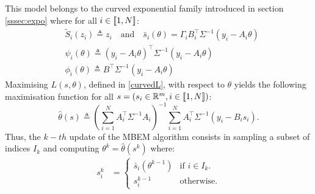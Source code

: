 \documentclass[11pt]{article}
\theoremstyle{plain}
\begin{document}
This model belongs to the curved exponential family introduced in section \ref{sssec:expo} where for all $i \in \llbracket1,N\rrbracket$:
\begin{align}\label{statmem}
& \tilde{S}_i(z_i) \triangleq z_i \quad \textrm{and} \quad \bar{s}_i(\theta) =  \Gamma_i B_i^\top\Sigma^{-1} (y_i - A_i\theta)\\
& \psi_i(\theta) \triangleq  (y_i - A_i\theta)^\top\Sigma^{-1}(y_i - A_i\theta)\\
& \phi_i(\theta) \triangleq B^\top \Sigma^{-1} (y_i - A_i\theta)
\end{align}
Maximising $L(s,\theta)$, defined in \eqref{curvedL}, with respect to $\theta$ yields the following maximisation function for all $s=(s_i \in \mathbb{R}^{m}, i \in \llbracket1,N\rrbracket)$:
\begin{equation*}
\hat{\theta}(s) \triangleq \left(\sum_{i=1}^{N}{A_i^\top \Sigma^{-1}A_i}\right)^{-1}\sum_{i=1}^{N}{A_i^\top \Sigma^{-1}(y_i - B_i s_i)}.
\end{equation*}
Thus, the $k-th$ update of the MBEM algorithm consists in sampling a subset of indices $I_k$ and computing $\theta^k = \hat{\theta}(s^k)$ where:
\begin{align*}
  s_i^k &=
  \begin{cases}
   \bar{s}_i(\theta^{k-1})        & \text{if } i \in I_k. \\
   s_i^{k-1}         & \text{otherwise}.
  \end{cases}
\end{align*}
\end{document}
